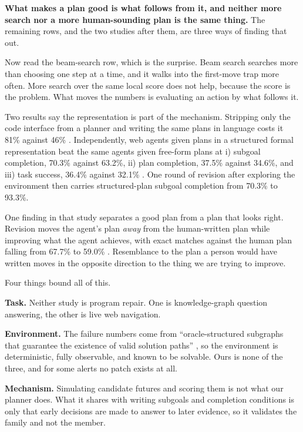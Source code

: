 \textbf{What makes a plan good is what follows from it, and neither more search nor a more
human-sounding plan is the same thing.} The remaining rows, and the two studies after them, are
three ways of finding that out.

Now read the beam-search row, which is the surprise. Beam search searches more than choosing one
step at a time, and it walks into the first-move trap more often. More search over the same
local score does not help, because the score is the problem. What moves the numbers is evaluating an
action by what follows it.

Two results say the representation is part of the mechanism. Stripping only the code interface from
a planner and writing the same plans in language costs it 81\% against 46\%
\citep[Figure~4c]{sun2023adaplanner}. Independently, web agents given plans in a structured formal
representation beat the same agents given free-form plans at i) subgoal completion, 70.3\% against
63.2\%, ii) plan completion, 37.5\% against 34.6\%, and iii) task success, 36.4\% against 32.1\%
\citep[Figure~3]{aghzal2026webagents}. One round of revision after exploring the environment then
carries structured-plan subgoal completion from 70.3\% to 93.3\%.

One finding in that study separates a good plan from a plan that looks right. Revision moves the
agent's plan \emph{away} from the human-written plan while improving what the agent achieves, with
exact matches against the human plan falling from 67.7\% to 59.0\%
\citep[Table~2]{aghzal2026webagents}. Resemblance to the plan a person would have written moves in
the opposite direction to the thing we are trying to improve.

Four things bound all of this.

\bi

\item \textbf{Task.} Neither study is program repair. One is knowledge-graph question answering, the
other is live web navigation.

\item \textbf{Environment.} The failure numbers come from ``oracle-structured subgraphs that
guarantee the existence of valid solution paths'' \citep[\S5.1]{wang2026reasoningplan}, so the
environment is deterministic, fully observable, and known to be solvable. Ours is none of the three,
and for some alerts no patch exists at all.

\item \textbf{Mechanism.} Simulating candidate futures and scoring them is not what our planner
does. What it shares with writing subgoals and completion conditions is only that early decisions
are made to answer to later evidence, so it validates the family and not the member.

